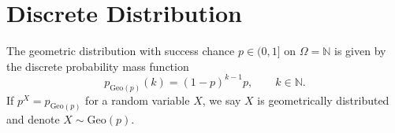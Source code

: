 \section{Discrete Distribution}

\begin{definition}
    The geometric distribution with success chance \(p \in (0, 1]\) on \(\Omega = \mathbb{N}\) is given by the discrete probability mass function
    \begin{equation}
        p_{\text{Geo}(p)} (k) = (1 - p)^{k - 1} p, \qquad k \in \mathbb{N}\text{.}
    \end{equation}
    If \(p^X = p_{\text{Geo}(p)}\) for a random variable \(X\), we say \(X\) is geometrically distributed and denote \(X \sim \text{Geo}(p)\).
\end{definition}